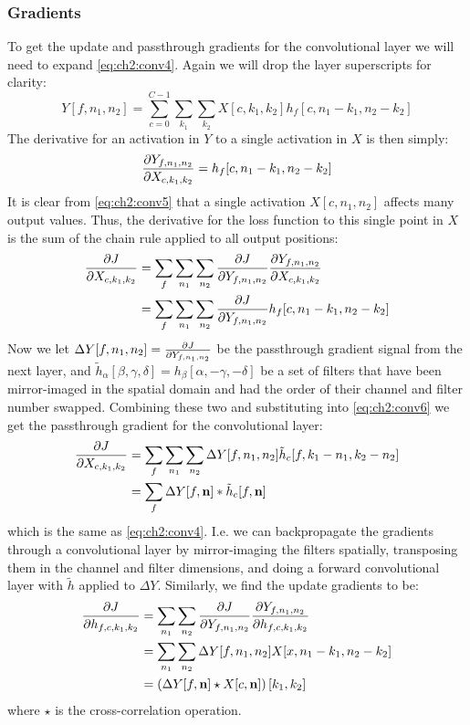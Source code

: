 \subsubsection{Gradients}\label{sec:ch2:conv_grad}
To get the update and passthrough gradients for the convolutional layer we will need to expand
\eqref{eq:ch2:conv4}. Again we will drop the layer superscripts for clarity: 
\begin{equation}
  Y[f, n_1, n_2] = \sum_{c=0}^{C-1} \sum_{k_1} \sum_{k_2} X[c, k_1, k_2]
  h_f[c, n_1-k_1, n_2-k_2] \label{eq:ch2:conv5}
\end{equation}
The derivative for an activation in $Y$ to a single activation in $X$ is then
simply:
\begin{equation}
  \frac{\partial Y_{f, n_1, n_2}}{\partial X_{c, k_1, k_2}} = h_f[c, n_1 - k_1, n_2 - k_2]
\end{equation}
It is clear from \eqref{eq:ch2:conv5} that a single activation $X[c, n_1, n_2]$ affects
many output values. Thus, the derivative for the loss function to this single
point in $X$ is the sum of the chain rule applied to all output positions:
\begin{align}
  \frac{\partial J}{\partial X_{c,k_1,k_2}} &= \sum_f \sum_{n_1} \sum_{n_2} \frac{\partial J}{\partial Y_{f, n_1, n_2}}
  \frac{\partial Y_{f, n_1, n_2}}{\partial X_{c,k_1,k_2}} \\
  &= \sum_f \sum_{n_1} \sum_{n_2} \frac{\partial J}{\partial Y_{f, n_1, n_2}} h_f[c, n_1 - k_1, n_2 - k_2] \label{eq:ch2:conv6}
\end{align}
Now we let $\Delta Y[f, n_1, n_2] = \frac{\partial J}{\partial Y_{f, n_1, n_2}}$ be the passthrough gradient
signal from the next layer, and $\tilde{h}_\alpha[\beta, \gamma, \delta] = h_\beta[\alpha, -\gamma, -\delta]$
be a set of filters that have been mirror-imaged in the spatial domain and had
the order of their channel and filter number swapped. Combining these two and
substituting into \eqref{eq:ch2:conv6} we get the passthrough gradient for the
convolutional layer:
\begin{align}
  \frac{\partial J}{\partial X_{c,k_1,k_2}} &= \sum_f \sum_{n_1} \sum_{n_2} \Delta Y[f, n_1, n_2] \tilde{h}_c[f, k_1-n_1, k_2-n_2 ] \\
                          &= \sum_f \Delta Y[f, \mathbf{n}] \ast \tilde{h}_c[f, \mathbf{n}]
\end{align}
which is the same as \eqref{eq:ch2:conv4}. I.e. we can backpropagate the
gradients through a convolutional layer by mirror-imaging the filters spatially,
transposing them in the channel and filter dimensions, and doing a forward
convolutional layer with $\tilde{h}$ applied to $\Delta Y$. Similarly, we 
find the update gradients to be:
\begin{align}
  \frac{\partial J}{\partial h_{f,c,k_1,k_2}} &= \sum_{n_1} \sum_{n_2} \frac{\partial J}{\partial Y_{f, n_1, n_2}} \frac{\partial Y_{f, n_1, n_2}}{\partial h_{f, c, k_1, k_2}} \\
                            &= \sum_{n_1} \sum_{n_2} \Delta Y[f, n_1, n_2] X[x, n_1-k_1, n_2-k_2 ] \\
                            &= \left(\Delta Y[f, \mathbf{n}] \star X[c, \mathbf{n}]\right)[k_1, k_2]
\end{align}
where $\star$ is the cross-correlation operation. 


